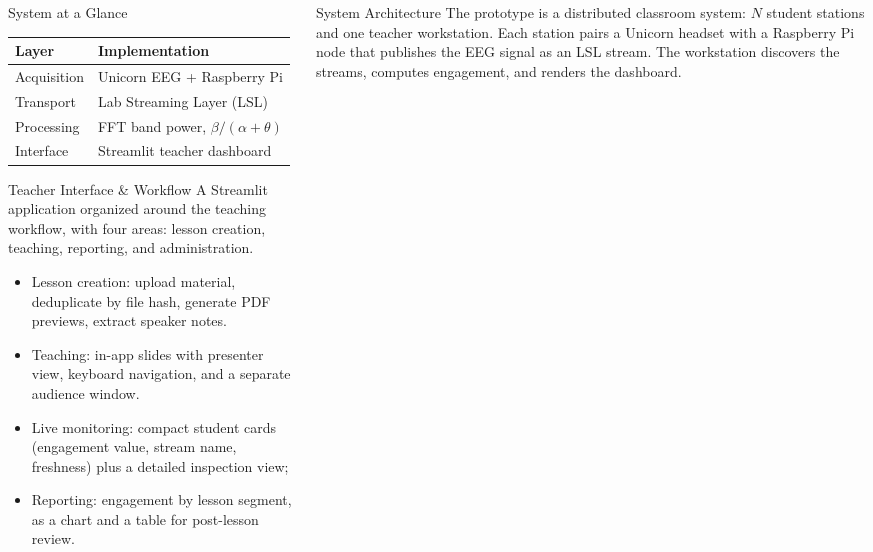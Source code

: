 \documentclass[final]{beamer}
\begin{document}
\begin{frame}[fragile]
\begin{columns}[t]
\begin{column}{0.3\paperwidth}
\begin{block}{System at a Glance}
    \begin{table}
    \centering
    \begin{tabular}{@{} ll @{}}
        \toprule
        Layer & Implementation \\
        \midrule
        Acquisition & Unicorn EEG + Raspberry Pi \\
        Transport   & Lab Streaming Layer (LSL) \\
        Processing  & FFT band power, $\beta/(\alpha{+}\theta)$ \\
        Interface   & Streamlit teacher dashboard \\
        \bottomrule
    \end{tabular}
    \end{table}
\end{block}

\begin{block}{Teacher Interface \& Workflow}
    A Streamlit application organized around the teaching workflow, with four
    areas: lesson creation, teaching, reporting, and administration.

    \begin{itemize}
        \item Lesson creation: upload material, deduplicate by file hash,
            generate PDF previews, extract speaker notes.
        \item Teaching: in-app slides with presenter view, keyboard
            navigation, and a separate audience window.
        \item Live monitoring: compact student cards (engagement value,
            stream name, freshness) plus a detailed inspection view;
        \item Reporting: engagement by lesson segment, as a chart and a
            table for post-lesson review.
    \end{itemize}
\end{block}


\end{column}

\separatorcolumn

\begin{column}{0.3\paperwidth}

\begin{block}{System Architecture}
    The prototype is a distributed classroom system: $N$ student
    stations and one teacher workstation. Each station pairs a Unicorn headset
    with a Raspberry Pi node that publishes the EEG signal as an LSL stream. The
    workstation discovers the streams, computes engagement, and renders the
    dashboard.


\end{block}
\end{column}
\end{columns}
\end{frame}
\end{document}
